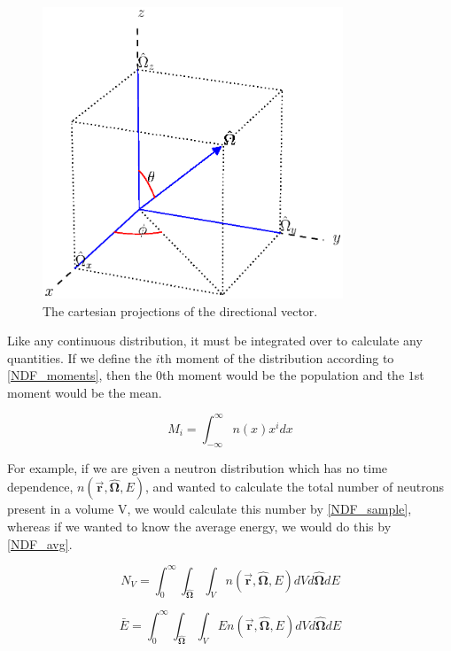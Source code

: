 \begin{figure}[h!] 
  \centering
    \includegraphics[width=0.8\textwidth , trim= 0cm 2.5cm 0cm 0cm]{graphics/ang_relation.eps} %
     \caption{The cartesian projections of the directional vector. \label{ang_relations}}
\end{figure}

Like any continuous distribution, it must be integrated over to calculate any quantities.  If we define the $i$th moment of the distribution according to \eqref{NDF_moments}, then the $0$th moment would be the population and the $1$st moment would be the mean.

\begin{equation}
\label{NDF_moments}
M_i = \int_{-\infty}^{\infty} n(x)  x^{i} dx
\end{equation}

For example, if we are given a neutron distribution which has no time dependence, $n(\boldsymbol{\vec{r}},\boldsymbol{\hat{\Omega}},E)$, and wanted to calculate the total number of neutrons present in a volume V, we would calculate this number by \eqref{NDF_sample}, whereas if we wanted to know the average energy, we would do this by \eqref{NDF_avg}.

\begin{equation}
\label{NDF_sample}
N_V = \int_0^\infty \int_{\boldsymbol{\hat{\Omega}}} \int_{V} n(\boldsymbol{\vec{r}},\boldsymbol{\hat{\Omega}},E) dV d\boldsymbol{\hat{\Omega}} dE
\end{equation}

\begin{equation}
\label{NDF_avg}
\bar{E} = \int_0^\infty \int_{\boldsymbol{\hat{\Omega}}} \int_{V} E n(\boldsymbol{\vec{r}},\boldsymbol{\hat{\Omega}},E) dV d\boldsymbol{\hat{\Omega}} dE
\end{equation}

